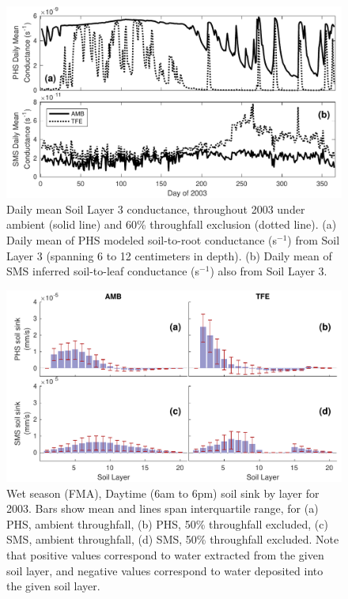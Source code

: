 \documentclass[draft,linenumbers]{agujournal}
\begin{document}
  \clearpage   
  \begin{figure}[h]
     \centering
     \includegraphics[width=30pc]{../figs2/fig6a.pdf}
     \caption{Daily mean Soil Layer 3 conductance, throughout 2003 under ambient (solid line) and 60\% throughfall exclusion (dotted line).
     (a) Daily mean of PHS modeled soil-to-root conductance (s$^{-1}$) from Soil Layer 3 (spanning 6 to 12 centimeters in depth).
     (b) Daily mean of SMS inferred soil-to-leaf conductance (s$^{-1}$) also from Soil Layer 3.
     }
     \label{fig:cond2}
  \end{figure}

        \clearpage
    \begin{figure}[h]
     \centering
     \includegraphics[width=30pc]{../figs2/fig8.pdf}
     \caption{Wet season (FMA), Daytime (6am to 6pm) soil sink by layer for 2003. 
     Bars show mean and lines span interquartile range, for 
     (a) PHS, ambient throughfall,
     (b) PHS, 50\% throughfall excluded,
     (c) SMS, ambient throughfall,
     (d) SMS, 50\% throughfall excluded. 
     Note that positive values correspond to water extracted from the given soil layer, 
     and negative values correspond to water deposited into the given soil layer.}
     \label{fig8}
  \end{figure}
  
\end{document}
